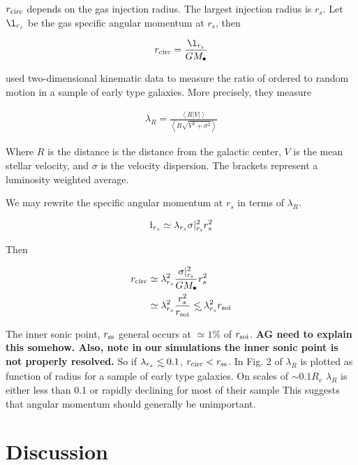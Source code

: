 \documentclass[usenatbib,fleqn]{mn2e}
\newcommand\lsim{\mathrel{\rlap{\lower4pt\hbox{\hskip1pt$\sim$}}
    \raise1pt\hbox{$<$}}}
\newcommand{\rs}{r_s}
\newcommand{\rcirc}{r_{\rm circ}}
\newcommand{\rss}{r_{\rm ss}}
\newcommand{\lrs}{\l_{\rs}}
\newcommand{\lambdars}{\lambda_{\rs}}
\newcommand{\Mbh}[1][]{M_{\bullet#1}}
\newcommand{\soi}{\rm soi}
\newcommand{\rsoi}{r_{\soi}}
\begin{document}
  $\rcirc$ depends on the gas injection radius. The largest
  injection radius is $\rs$. Let $\lrs$ be the gas specific angular
  momentum at $\rs$, then 

  \begin{align}
    \rcirc=\frac{\lrs}{G \Mbh}
  \end{align}

  \citet{EmsellemCappellari+:2007a} used two-dimensional kinematic
  data to measure the ratio of ordered to random motion in a sample of
  early type galaxies. More precisely, they measure

  \begin{align}
    \lambda_R=\frac{\left<R|V|\right>}{\left<R\sqrt{V^2+\sigma^2}\right>}
  \end{align}

  Where $R$ is the distance is the distance from the galactic center, $V$ is
  the mean stellar velocity, and $\sigma$ is the velocity
  dispersion. The brackets represent a luminosity weighted average.

  We may rewrite the specific angular momentum at $\rs$ in terms of
  $\lambda_R$.

  \begin{align}
    \lrs\simeq\lambdars \sigma|_{r_{\rm s}}^2 \rs^2
  \end{align}

  Then

  \begin{align}
    \rcirc&\simeq\lambdars^2 \frac{\sigma|_{r_{\rm s}}^2}{G \Mbh} \rs^2\\
    &\simeq\lambdars^2 \frac{\rs^2}{\rsoi} \lsim \lambdars^2 \rsoi
  \end{align}

  The inner sonic point, $\rss$ general occurs at $\simeq 1\%$ of
  $\rsoi$. {\bf AG need to explain this somehow. Also, note in our
    simulations the inner sonic point is not properly resolved.}
  So if $\lambdars\lsim 0.1$, $\rcirc<\rss$. In Fig. 2 of
  \citet{EmsellemCappellari+:2007a} $\lambda_R$ is plotted as function
  of radius for a sample of early type galaxies. On scales of $\sim 0.1
  R_e$ $\lambda_R$ is either less than 0.1 or rapidly declining for most
  of their sample %
  This suggests that angular momentum should generally be unimportant.

\section{Discussion}
\end{document}
